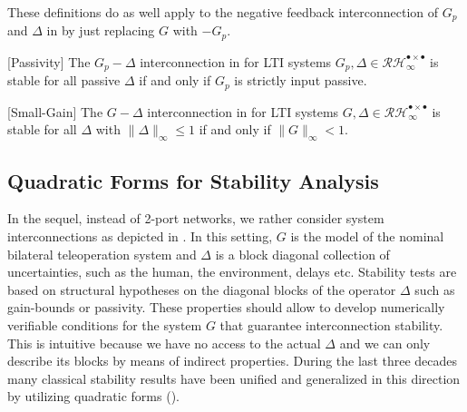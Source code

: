 These definitions do as well apply to the negative feedback interconnection of $G_p$ and $\Delta$ in  by just replacing $G$ with $-G_p$.

\begin{thm}\label{thm:passive}[Passivity] The $G_p-\Delta$ interconnection in  for LTI systems $G_p,\Delta\in\mathcal{RH}^{\bullet\times\bullet}_\infty$ is stable for all passive $\Delta$ if and only if $G_p$ is strictly input passive.
\end{thm}

\begin{thm}\label{thm:sg}[Small-Gain] The $G-\Delta$ interconnection in  for LTI systems $G,\Delta\in\mathcal{RH}^{\bullet\times\bullet}_\infty$ is stable for all $\Delta$ with $\|\Delta\|_\infty \leq 1$ if and only if $\|G\|_\infty < 1$.
\end{thm}


%
%

\subsection{Quadratic Forms for Stability Analysis}
{In the sequel, instead of 2-port networks, we rather consider system interconnections as depicted in }. In this {setting}, $G$ is the model of the nominal bilateral teleoperation system and $\Delta$ is a block diagonal collection of uncertainties, {such as the} human, {the} environment, delays etc. {Stability tests are based on structural hypotheses on the diagonal blocks of the operator $\Delta$ such as gain-bounds or passivity. These properties should allow to develop numerically verifiable conditions} for the system $G$ {that} guarantee interconnection stability. This is intuitive because we have no access to the actual $\Delta$ and we can only describe {its blocks} by means of indirect properties. {During the last three decades many classical stability results have been unified and generalized in this direction by} utilizing quadratic forms (\cite{safonov,carsten2,iwasaki,megretski}).

